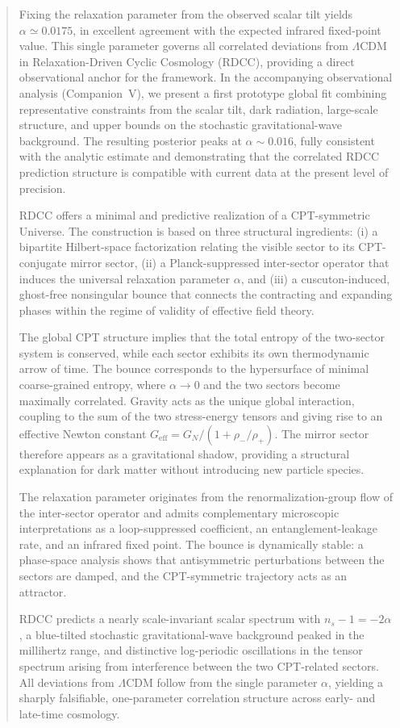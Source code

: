 \documentclass[11pt,a4paper]{article}
\begin{document}
\clearpage

\begin{abstract}

Fixing the relaxation parameter from the observed scalar tilt yields
$\alpha \simeq 0.0175$, in excellent agreement with the expected infrared
fixed-point value. This single parameter governs all correlated deviations
from $\Lambda$CDM in Relaxation-Driven Cyclic Cosmology (RDCC), providing a
direct observational anchor for the framework. In the accompanying
observational analysis (Companion~V), we present a first prototype global fit
combining representative constraints from the scalar tilt, dark radiation,
large-scale structure, and upper bounds on the stochastic gravitational-wave
background. The resulting posterior peaks at $\alpha \sim 0.016$, fully
consistent with the analytic estimate and demonstrating that the correlated
RDCC prediction structure is compatible with current data at the present level
of precision.

RDCC offers a minimal and predictive realization of a CPT-symmetric Universe.
The construction is based on three structural ingredients: (i) a bipartite
Hilbert-space factorization relating the visible sector to its CPT-conjugate
mirror sector, (ii) a Planck-suppressed inter-sector operator that induces the
universal relaxation parameter $\alpha$, and (iii) a cuscuton-induced,
ghost-free nonsingular bounce that connects the contracting and expanding
phases within the regime of validity of effective field theory.

The global CPT structure implies that the total entropy of the two-sector
system is conserved, while each sector exhibits its own thermodynamic arrow of
time. The bounce corresponds to the hypersurface of minimal coarse-grained
entropy, where $\alpha \to 0$ and the two sectors become maximally correlated.
Gravity acts as the unique global interaction, coupling to the sum of the two
stress-energy tensors and giving rise to an effective Newton constant
$G_{\mathrm{eff}} = G_{N}/(1 + \rho_{-}/\rho_{+})$. The mirror sector therefore
appears as a gravitational shadow, providing a structural explanation for dark
matter without introducing new particle species.

The relaxation parameter originates from the renormalization-group flow of the
inter-sector operator and admits complementary microscopic interpretations as a
loop-suppressed coefficient, an entanglement-leakage rate, and an infrared
fixed point. The bounce is dynamically stable: a phase-space analysis shows
that antisymmetric perturbations between the sectors are damped, and the
CPT-symmetric trajectory acts as an attractor.

RDCC predicts a nearly scale-invariant scalar spectrum with
$n_{s} - 1 = -2\alpha$, a blue-tilted stochastic gravitational-wave background
peaked in the millihertz range, and distinctive log-periodic oscillations in
the tensor spectrum arising from interference between the two CPT-related
sectors. All deviations from $\Lambda$CDM follow from the single parameter
$\alpha$, yielding a sharply falsifiable, one-parameter correlation structure
across early- and late-time cosmology.

\end{abstract}
\end{document}
